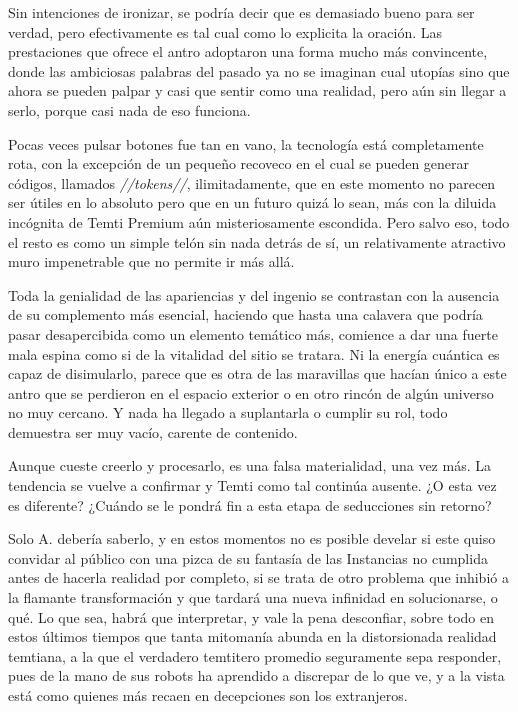 \documentclass[
  spanish,
]{book}
\begin{document}
Sin intenciones de ironizar, se podría decir que es demasiado bueno para ser verdad, pero efectivamente es tal cual como lo explicita la oración. Las prestaciones que ofrece el antro adoptaron una forma mucho más convincente, donde las ambiciosas palabras del pasado ya no se imaginan cual utopías sino que ahora se pueden palpar y casi que sentir como una realidad, pero aún sin llegar a serlo, porque casi nada de eso funciona.

Pocas veces pulsar botones fue tan en vano, la tecnología está completamente rota, con la excepción de un pequeño recoveco en el cual se pueden generar códigos, llamados \emph{//tokens//}, ilimitadamente, que en este momento no parecen ser útiles en lo absoluto pero que en un futuro quizá lo sean, más con la diluida incógnita de Temti Premium aún misteriosamente escondida. Pero salvo eso, todo el resto es como un simple telón sin nada detrás de sí, un relativamente atractivo muro impenetrable que no permite ir más allá.

Toda la genialidad de las apariencias y del ingenio se contrastan con la ausencia de su complemento más esencial, haciendo que hasta una calavera que podría pasar desapercibida como un elemento temático más, comience a dar una fuerte mala espina como si de la vitalidad del sitio se tratara. Ni la energía cuántica es capaz de disimularlo, parece que es otra de las maravillas que hacían único a este antro que se perdieron en el espacio exterior o en otro rincón de algún universo no muy cercano. Y nada ha llegado a suplantarla o cumplir su rol, todo demuestra ser muy vacío, carente de contenido.

Aunque cueste creerlo y procesarlo, es una falsa materialidad, una vez más. La tendencia se vuelve a confirmar y Temti como tal continúa ausente. ¿O esta vez es diferente? ¿Cuándo se le pondrá fin a esta etapa de seducciones sin retorno?

Solo A. debería saberlo, y en estos momentos no es posible develar si este quiso convidar al público con una pizca de su fantasía de las Instancias no cumplida antes de hacerla realidad por completo, si se trata de otro problema que inhibió a la flamante transformación y que tardará una nueva infinidad en solucionarse, o qué.
Lo que sea, habrá que interpretar, y vale la pena desconfiar, sobre todo en estos últimos tiempos que tanta mitomanía abunda en la distorsionada realidad temtiana, a la que el verdadero temtitero promedio seguramente sepa responder, pues de la mano de sus robots ha aprendido a discrepar de lo que ve, y a la vista está como quienes más recaen en decepciones son los extranjeros.
\end{document}
